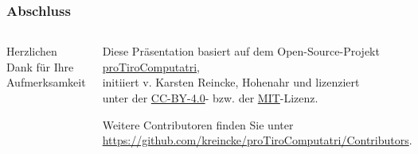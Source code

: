 
\begin{frame}
  \frametitle{Abschluss}
  \begin{columns}

    Herzlichen Dank für Ihre Aufmerksamkeit

    \begin{footnotesize}Diese Präsentation basiert auf dem Open-Source-Projekt \href{https://github.com/kreincke/proTiroComputatri}{proTiroComputatri},\\
      initiiert v. Karsten Reincke, Hohenahr und lizenziert\\
      unter der \href{https://creativecommons.org/licenses/by/4.0/}{CC-BY-4.0}- bzw. der \href{https://github.com/kreincke/proTiroComputatri/LICENSE.MIT.md}{MIT}-Lizenz. 
    
    Weitere Contributoren finden Sie unter \\
    \tiny{\href{https://github.com/kreincke/proTiroComputatri/Contributors}{https://github.com/kreincke/proTiroComputatri/Contributors}}.
    \end{footnotesize}
  \end{columns}
\end{frame}
